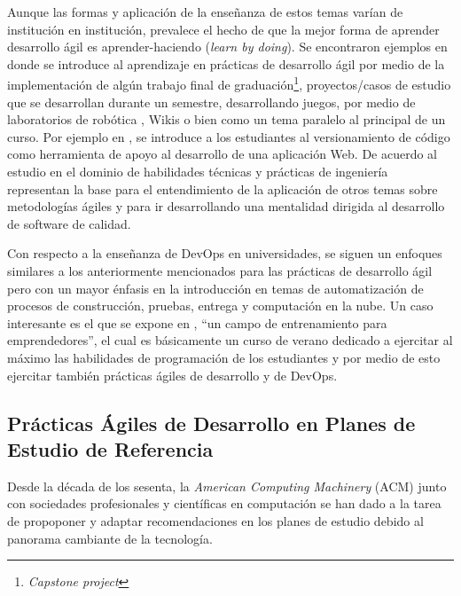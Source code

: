 \documentclass[journal]{IEEEtran}
\begin{document}
Aunque las formas y aplicación de la enseñanza de estos temas varían de institución en institución, prevalece el hecho de que la mejor forma de aprender desarrollo ágil es aprender-haciendo (\emph{learn by doing}). Se encontraron ejemplos en donde se introduce al aprendizaje en prácticas de desarrollo ágil por medio de la implementación de algún trabajo final de graduación\footnote{\emph{Capstone project}}\cite{ding-yousef-yue}, proyectos/casos de estudio que se desarrollan durante un semestre\cite{steghoger-et-al}, desarrollando juegos\cite{scharlau}, por medio de laboratorios de robótica \cite{schroeder-et-al}, Wikis \cite{cubric} o bien como un tema paralelo al principal de un curso. Por ejemplo en \cite{haaranen-lehtinen}, se introduce a los estudiantes al versionamiento de código como herramienta de apoyo al desarrollo de una aplicación Web. De acuerdo al estudio en \cite{kropp-meier-2} el dominio de habilidades técnicas y prácticas de ingeniería representan la base para el entendimiento de la aplicación de otros temas sobre metodologías ágiles y para ir desarrollando una mentalidad dirigida al desarrollo de software de calidad.

Con respecto a la enseñanza de DevOps en universidades, se siguen un enfoques similares a los anteriormente mencionados para las prácticas de desarrollo ágil pero con un mayor énfasis en la introducción en temas de automatización \cite{henrik-b, bang-et-al, betz-et-al} de procesos de construcción, pruebas, entrega y computación en la nube. Un caso interesante es el que se expone en \cite{hickey-salas}, ``un campo de entrenamiento para emprendedores'', el cual es básicamente un curso de verano dedicado a ejercitar al máximo las habilidades de programación de los estudiantes y por medio de esto ejercitar también prácticas ágiles de desarrollo y de DevOps.





\subsection{Prácticas Ágiles de Desarrollo en Planes de Estudio de Referencia}
Desde la década de los sesenta, la \emph{American Computing Machinery} (ACM) junto con sociedades profesionales y científicas en computación se han dado a la tarea de propoponer y adaptar  recomendaciones en los planes de estudio debido al panorama cambiante de la tecnología\cite{acm-curriculum}.
\end{document}
